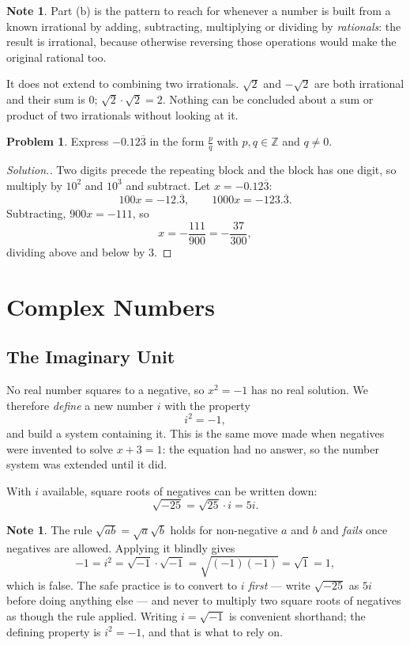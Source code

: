 \documentclass[11pt,a4paper]{article}
\theoremstyle{definition}
\newtheorem{note}[thm]{Note}
\newtheorem{problemx}{Problem}[section]
\newenvironment{problem}{\begin{problemx}}{\end{problemx}}
\newenvironment{solution}
  {\renewcommand{\qedsymbol}{}\begin{proof}[\textit{Solution}.]}
  {\end{proof}}
\begin{document}
\begin{note}
Part (b) is the pattern to reach for whenever a number is built from a known
irrational by adding, subtracting, multiplying or dividing by \emph{rationals}: the
result is irrational, because otherwise reversing those operations would make the
original rational too.

It does not extend to combining two irrationals. $\sqrt{2}$ and $-\sqrt{2}$ are
both irrational and their sum is $0$; $\sqrt{2}\cdot\sqrt{2}=2$. Nothing can be
concluded about a sum or product of two irrationals without looking at it.
\end{note}

\pagebreak

\begin{problem}
Express $-0.12\overline{3}$ in the form $\frac{p}{q}$ with $p,q\in\mathbb{Z}$ and
$q\neq 0$.
\end{problem}

\begin{solution}
Two digits precede the repeating block and the block has one digit, so multiply by
$10^{2}$ and $10^{3}$ and subtract. Let $x=-0.12\overline{3}$:
$$100x=-12.\overline{3},\qquad 1000x=-123.\overline{3}.$$
Subtracting, $900x=-111$, so
$$x=-\frac{111}{900}=-\frac{37}{300},$$
dividing above and below by $3$.
\end{solution}

\section{Complex Numbers}

\subsection{The Imaginary Unit}
No real number squares to a negative, so $x^{2}=-1$ has no real solution. We
therefore \emph{define} a new number $i$ with the property
$$i^{2}=-1,$$
and build a system containing it. This is the same move made when negatives were
invented to solve $x+3=1$: the equation had no answer, so the number system was
extended until it did.

With $i$ available, square roots of negatives can be written down:
$$\sqrt{-25}=\sqrt{25}\cdot i=5i .$$

\begin{note}
The rule $\sqrt{ab}=\sqrt{a}\sqrt{b}$ holds for non-negative $a$ and $b$ and
\emph{fails} once negatives are allowed. Applying it blindly gives
$$-1=i^{2}=\sqrt{-1}\cdot\sqrt{-1}=\sqrt{(-1)(-1)}=\sqrt{1}=1,$$
which is false. The safe practice is to convert to $i$ \emph{first} --- write
$\sqrt{-25}$ as $5i$ before doing anything else --- and never to multiply two square
roots of negatives as though the rule applied. Writing $i=\sqrt{-1}$ is convenient
shorthand; the defining property is $i^{2}=-1$, and that is what to rely on.
\end{note}
\end{document}
